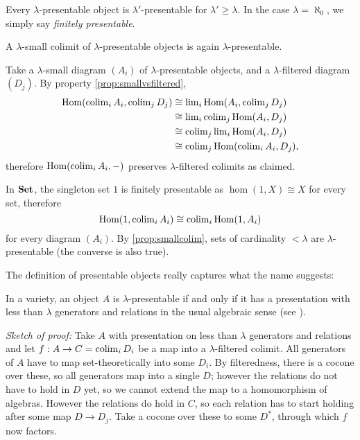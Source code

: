 Every $\lambda$-presentable object is $\lambda'$-presentable for $\lambda' \geq \lambda$. In the case $\lambda=\aleph_0$, we simply say \emph{finitely presentable}. \\

\begin{Lemma}\label{prop:smallcolim} A $\lambda$-small colimit of $\lambda$-presentable objects is again $\lambda$-presentable.
\end{Lemma}
\begin{Proof}
Take a $\lambda$-small diagram $(A_i)$ of $\lambda$-presentable objects, and a $\lambda$-filtered diagram $(D_j)$. By property \ref{prop:smallvsfiltered},
\begin{align*}
\textrm{Hom}(\operatorname{colim}_i A_i, \operatorname{colim}_j D_j) &\cong \operatorname{lim}_i \textrm{Hom}(A_i, \operatorname{colim}_j D_j) \\
&\cong \operatorname{lim}_i \operatorname{colim}_j \textrm{Hom}(A_i, D_j) \\
&\cong \operatorname{colim}_j \operatorname{lim}_i \textrm{Hom}(A_i, D_j) \\
&\cong \operatorname{colim}_j \textrm{Hom}(\operatorname{colim}_i A_i, D_j),
\end{align*}
therefore $\textrm{Hom}(\operatorname{colim}_i A_i, -)$ preserves $\lambda$-filtered colimits as claimed.
\end{Proof}

\begin{Example}
In $\mathbf{Set}$, the singleton set $1$ is finitely presentable as $\hom(1,X) \cong X$ for every set, therefore
\[ \textrm{Hom}(1,\operatorname{colim}_i A_i) \cong \operatorname{colim}_i \textrm{Hom}(1,A_i) \]
for every diagram $(A_i)$. By \ref{prop:smallcolim}, sets of cardinality $< \lambda$ are $\lambda$-presentable (the converse is also true).
\end{Example}

The definition of presentable objects really captures what the name suggests: 

\begin{Proposition}\label{prop:varietypresentable} In a variety, an object $A$ is $\lambda$-presentable if and only if it has a presentation with less than $\lambda$ generators and relations in the usual algebraic sense (see \cite[Chapter 3.A]{AdamekRosicky}).
\end{Proposition}
\textit{Sketch of proof:} Take $A$ with presentation on less than $\lambda$ generators and relations and let $f : A \to C = \operatorname{colim}_i D_i$ be a map into a $\lambda$-filtered colimit. All generators of $A$ have to map set-theoretically into some $D_i$. By filteredness, there is a cocone over these, so all generators map into a single $D$; however the relations do not have to hold in $D$ yet, so we cannot extend the map to a homomorphism of algebras. However the relations do hold in $C$, so each relation has to start holding after some map $D \to D_j$. Take a cocone over these to some $D^*$, through which $f$ now factors. \\

